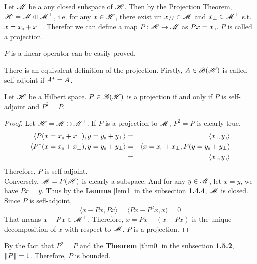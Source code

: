 \documentclass[a4paper,11pt]{report}
\begin{document}
\begin{defn}
	Let $\mathscr{M}$ be a any closed subspace of $\mathscr{H}$. Then by the Projection Theorem, $\mathscr{H} = \mathscr{M} \oplus \mathscr{M}^{\bot}$, i.e. for any $x \in \mathscr{H}$, there exist un $x_{//} \in \mathscr{M}$ and $x_{\bot} \in \mathscr{M}^{\bot}$ s.t.$x = x_{\shortparallel} + x_{\bot}$. Therefor we can define a map $P \colon \mathscr{H} \rightarrow \mathscr{M}$ as $Px=x_{\shortparallel}$. $P$ is called a projection.
\end{defn}
\begin{rem}
	$P$ is a linear operator can be easily proved.
\end{rem}

There is an equivalent definition of the projection. Firstly, $A \in \mathscr{B(H)}$ is called self-adjoint if $A^{*} = A$.

\begin{thm}
	Let $\mathscr{H}$ be a Hilbert space. $P \in \mathscr{B(H)}$ is a projection if and only if $P$ is self-adjoint and $P^2=P$.
\end{thm}
\begin{proof}
	Let $\mathscr{H} = \mathscr{M} \oplus \mathscr{M}^{\bot}$. If $P$ is a projection to $\mathscr{M}$, $P^2=P$ is clearly true. 
	\begin{eqnarray*}
		\langle P(x = x_{\shortparallel} + x_{\bot}), y = y_{\shortparallel} + y_{\bot} \rangle &=& \langle x_{\shortparallel}, y_{\shortparallel} \rangle \\
		\langle P^{*}(x = x_{\shortparallel} + x_{\bot}), y = y_{\shortparallel} + y_{\bot} \rangle &=& \langle x = x_{\shortparallel} + x_{\bot}, P(y = y_{\shortparallel} + y_{\bot}) \\
		&=& \langle x_{\shortparallel}, y_{\shortparallel} \rangle
	\end{eqnarray*}
	Therefore, $P$ is self-adjoint. \\
	Conversely, $\mathscr{M}=P(\mathscr{H})$ is clearly a subspace. And for any $y \in \mathscr{M}$, let $x=y$, we have $Px = y$. Thus by the \textbf{Lemma} \ref{lem1} in the subsection \textbf{1.4.4}, $\mathscr{M}$ is closed. Since $P$ is sefl-adjoint, 
	\begin{equation*}
		\langle x-Px,Px \rangle = \langle Px-P^2x,x \rangle = 0
	\end{equation*}
	That means $x-Px \in \mathscr{M}^{\bot}$. Therefore, $x=Px+(x-Px)$ is the unique decomposition of $x$ with respect to $\mathscr{M}$. $P$ is a projection. 
\end{proof}
\begin{rem}
	By the fact that $P^2 =P$ and the \textbf{Theorem} \ref{thm0} in the subsection \textbf{1.5.2}, $\left\lVert P\right\lVert = 1$. Therefore, $P$ is bounded.
\end{rem}
\end{document}
